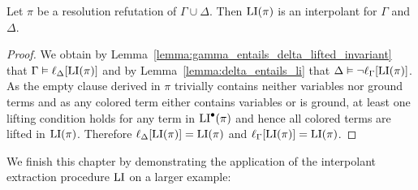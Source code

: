 \begin{thm}
	Let $\pi$ be a resolution refutation of $\Gamma \cup \Delta$.
	Then $\operatorname{LI}(\pi)$ is an interpolant for $\Gamma$ and $\Delta$.
\end{thm}
\begin{proof}
	We obtain by Lemma~\ref{lemma:gamma_entails_delta_lifted_invariant} that  $\Gamma \vDash \ell_{\Delta}[\operatorname{LI}(\pi)]$ and
	by Lemma~\ref{lemma:delta_entails_li} that
	$\Delta \vDash \lnot\ell_{\Gamma}[\operatorname{LI}(\pi)]$.
	As the empty clause derived in $\pi$ trivially contains neither variables nor ground terms and as any colored term either contains variables or is ground, at least one lifting condition holds for any term in $\operatorname{LI}^\bullet(\pi)$ and hence all colored terms are lifted in $\operatorname{LI}(\pi)$.
	Therefore $\ell_{\Delta}[\operatorname{LI}(\pi)] = \operatorname{LI}(\pi)$ and $\ell_{\Gamma}[\operatorname{LI}(\pi)] = \operatorname{LI}(\pi)$.
\end{proof}

We finish this chapter by demonstrating the application of the interpolant extraction procedure $\operatorname{LI}$ on a larger example:

